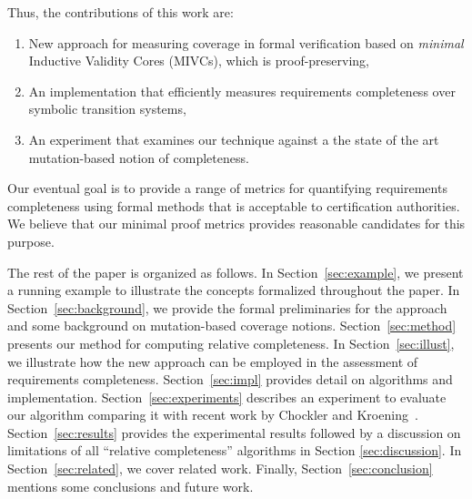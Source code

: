 Thus, the contributions of this work are:
\begin{enumerate}
\item New approach for measuring coverage in formal verification based on \emph{minimal} Inductive Validity Cores (MIVCs), which is proof-preserving,
\item An implementation that efficiently measures requirements completeness over symbolic transition systems,
\item An experiment that examines our technique against a the state of the art mutation-based notion of completeness.
\end{enumerate}

\noindent Our eventual goal is to provide a range of metrics for quantifying requirements completeness using formal methods that is acceptable to certification authorities.  We believe that our minimal proof metrics provides reasonable candidates for this purpose.


The rest of the paper is organized as follows.  In Section~\ref{sec:example}, we present a running example to illustrate the concepts formalized throughout the paper.  In Section~\ref{sec:background}, we provide the formal preliminaries for the approach and some background on mutation-based coverage notions.  Section~\ref{sec:method} presents our method for computing relative completeness.
In Section~\ref{sec:illust}, we illustrate how the new approach can be employed in the assessment of requirements completeness.
Section~\ref{sec:impl} provides detail on algorithms and implementation. Section~\ref{sec:experiments} describes an experiment to evaluate our algorithm comparing it with recent work by Chockler and Kroening~\cite{chockler2010coverage}. 
Section~\ref{sec:results} provides the experimental results followed by a discussion on limitations of all ``relative completeness'' algorithms in Section \ref{sec:discussion}.  In Section~\ref{sec:related}, we cover related work.  Finally, Section~\ref{sec:conclusion} mentions some conclusions and future work.

